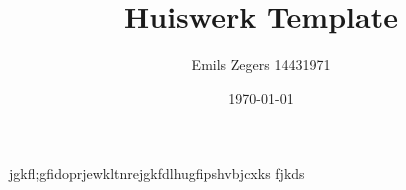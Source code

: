 \documentclass[a4paper]{article}
\title{Huiswerk Template}
\author{Emils Zegers 14431971}
\date{\today}
\begin{document}
\maketitle
jgkfl;gfidoprjewkltnrejgkfdlhugfipshvbjcxks
fjkds
\end{document}
